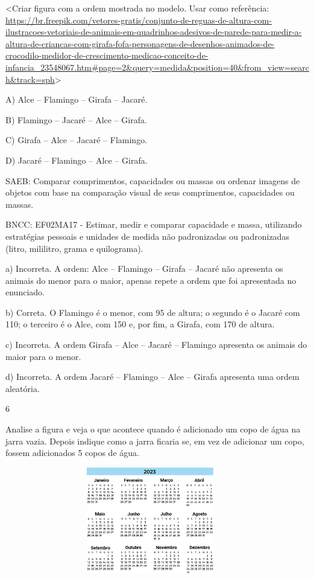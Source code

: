 \begin{escolha}
\begin{escolha}
{{{{\textless{}Criar figura com a ordem mostrada no modelo. Usar como
referência:
\url{https://br.freepik.com/vetores-gratis/conjunto-de-reguas-de-altura-com-ilustracoes-vetoriais-de-animais-em-quadrinhos-adesivos-de-parede-para-medir-a-altura-de-criancas-com-girafa-fofa-personagens-de-desenhos-animados-de-crocodilo-medidor-de-crescimento-medicao-conceito-de-infancia_23548067.htm\#page=2\&query=medida\&position=40\&from_view=search\&track=sph}\textgreater{}

A) Alce -- Flamingo -- Girafa -- Jacaré.

B) Flamingo -- Jacaré -- Alce -- Girafa.

C) Girafa -- Alce -- Jacaré -- Flamingo.

D) Jacaré -- Flamingo -- Alce -- Girafa.

SAEB: Comparar comprimentos, capacidades ou massas ou ordenar
imagens de objetos com base na comparação visual de seus comprimentos,
capacidades ou massas.

BNCC: EF02MA17 - Estimar, medir e comparar capacidade
e massa, utilizando estratégias pessoais e unidades de medida não
padronizadas ou padronizadas (litro, mililitro, grama e quilograma).

a) Incorreta. A ordem: Alce -- Flamingo -- Girafa -- Jacaré não
apresenta os animais do menor para o maior, apenas repete a ordem que
foi apresentada no enunciado.

b) Correta. O Flamingo é o menor, com 95 de altura; o segundo é o Jacaré
com 110; o terceiro é o Alce, com 150 e, por fim, a Girafa, com 170 de
altura.

c) Incorreta. A ordem Girafa -- Alce -- Jacaré -- Flamingo apresenta
os animais do maior para o menor.

d) Incorreta. A ordem Jacaré -- Flamingo -- Alce -- Girafa apresenta
uma ordem aleatória.

\num{6}

Analise a figura e veja o que acontece quando é adicionado um copo de
água na jarra vazia. Depois indique como a jarra ficaria se, em vez de
adicionar um copo, fossem adicionados 5 copos de água.

\includegraphics[width=5.00000in,height=1.82640in]{media/image144.png}

}}}}
\end{escolha}
\end{escolha}
